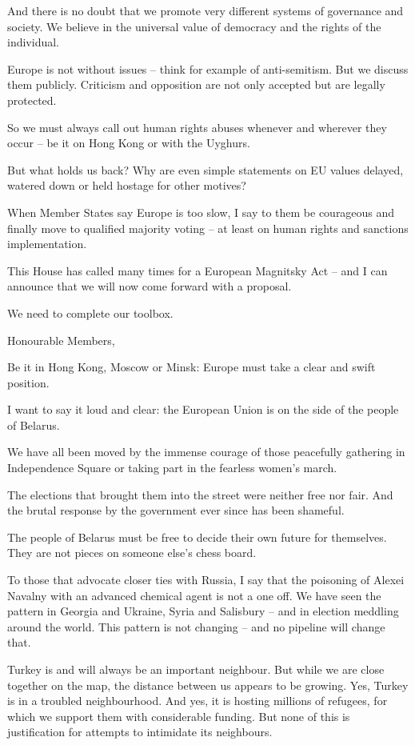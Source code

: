 \documentclass[a4paper,11pt]{article}
\begin{document}
And there is no doubt that we promote very different systems of governance and society. We believe in the universal value of democracy and the rights of the individual. 

Europe is not without issues – think for example of anti-semitism. But we discuss them publicly. Criticism and opposition are not only accepted but are legally protected.

So we must always call out human rights abuses whenever and wherever they occur – be it on Hong Kong or with the Uyghurs.

But what holds us back? Why are even simple statements on EU values delayed, watered down or held hostage for other motives?

When Member States say Europe is too slow, I say to them be courageous and finally move to qualified majority voting – at least on human rights and sanctions implementation. 

This House has called many times for a European Magnitsky Act – and I can announce that we will now come forward with a proposal.

We need to complete our toolbox.

 

Honourable Members,

Be it in Hong Kong, Moscow or Minsk: Europe must take a clear and swift position.

I want to say it loud and clear: the European Union is on the side of the people of Belarus.

We have all been moved by the immense courage of those peacefully gathering in Independence Square or taking part in the fearless women's march.

The elections that brought them into the street were neither free nor fair. And the brutal response by the government ever since has been shameful.

The people of Belarus must be free to decide their own future for themselves. They are not pieces on someone else's chess board.

To those that advocate closer ties with Russia, I say that the poisoning of Alexei Navalny with an advanced chemical agent is not a one off. We have seen the pattern in Georgia and Ukraine, Syria and Salisbury – and in election meddling around the world. This pattern is not changing – and no pipeline will change that.

Turkey is and will always be an important neighbour. But while we are close together on the map, the distance between us appears to be growing. Yes, Turkey is in a troubled neighbourhood. And yes, it is hosting millions of refugees, for which we support them with considerable funding. But none of this is justification for attempts to intimidate its neighbours.
\end{document}
